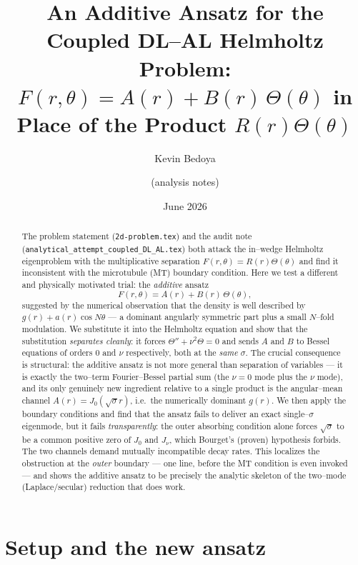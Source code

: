 \documentclass{article}
\title{An Additive Ansatz for the Coupled DL--AL Helmholtz Problem:\\
$F(r,\theta)=A(r)+B(r)\,\Theta(\theta)$ in Place of the Product $R(r)\Theta(\theta)$}
\author{Kevin Bedoya \and (analysis notes)}
\date{June 2026}
\begin{document}
\maketitle

\begin{abstract}
The problem statement (\texttt{2d-problem.tex}) and the audit note
(\texttt{analytical\_attempt\_coupled\_DL\_AL.tex}) both attack the in--wedge
Helmholtz eigenproblem with the multiplicative separation
$F(r,\theta)=R(r)\Theta(\theta)$ and find it inconsistent with the microtubule
(MT) boundary condition. Here we test a different and physically motivated
trial: the \emph{additive} ansatz
\[
F(r,\theta)=A(r)+B(r)\,\Theta(\theta),
\]
suggested by the numerical observation that the density is well described by
$g(r)+a(r)\cos N\theta$ --- a dominant angularly symmetric part plus a small
$N$--fold modulation. We substitute it into the Helmholtz equation and show that
the substitution \emph{separates cleanly}: it forces $\Theta''+\nu^2\Theta=0$ and
sends $A$ and $B$ to Bessel equations of orders $0$ and $\nu$ respectively, both
at the \emph{same} $\sigma$. The crucial consequence is structural: the additive
ansatz is not more general than separation of variables --- it is exactly the
two--term Fourier--Bessel partial sum (the $\nu=0$ mode plus the $\nu$ mode), and
its only genuinely new ingredient relative to a single product is the
angular--mean channel $A(r)=J_0(\sqrt\sigma r)$, i.e.\ the numerically dominant
$g(r)$. We then apply the boundary conditions and find that the ansatz fails to
deliver an exact single--$\sigma$ eigenmode, but it fails \emph{transparently}:
the outer absorbing condition alone forces $\sqrt\sigma$ to be a common positive
zero of $J_0$ and $J_\nu$, which Bourget's (proven) hypothesis forbids. The two
channels demand mutually incompatible decay rates. This localizes the
obstruction at the \emph{outer} boundary --- one line, before the MT condition
is even invoked --- and shows the additive ansatz to be precisely the analytic
skeleton of the two--mode (Laplace/secular) reduction that does work.
\end{abstract}

\section{Setup and the new ansatz}
\end{document}
